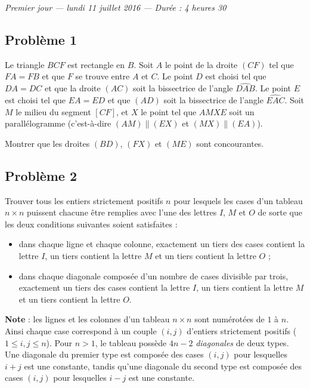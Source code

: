 
\begin{center}
  \emph{Premier jour --- lundi 11 juillet 2016 --- Durée : 4 heures 30}
\end{center}

\subsection*{Problème 1}
Le triangle $BCF$ est rectangle en $B$. Soit $A$ le point de la droite $(CF)$ tel que $FA = FB$ et que $F$ se
trouve entre $A$ et $C$. Le point $D$ est choisi tel que $DA = DC$ et que la droite $(AC)$ soit la bissectrice
de l'angle $\widehat{DAB}$. Le point $E$ est choisi tel que $EA = ED$ et que $(AD)$ soit la bissectrice de
l'angle $\widehat{EAC}$. Soit $M$ le milieu du segment $[CF]$, et $X$ le point tel que $AMXE$ soit un
parallélogramme (c'est-à-dire $(AM) \parallel (EX)$ et $(MX) \parallel (EA)$).

Montrer que les droites $(BD)$, $(FX)$ et $(ME)$ sont concourantes.

\subsection*{Problème 2}
Trouver tous les entiers strictement positifs $n$ pour lesquels les cases d'un tableau $n \times n$ puissent
chacune être remplies avec l'une des lettres $I$, $M$ et $O$ de sorte que les deux conditions suivantes soient
satisfaites :
\begin{itemize}
  \item dans chaque ligne et chaque colonne, exactement un tiers des cases contient la lettre $I$, un tiers
  contient la lettre $M$ et un tiers contient la lettre $O$ ;
  \item dans chaque diagonale composée d'un nombre de cases divisible par trois, exactement un tiers des cases
  contient la lettre $I$, un tiers contient la lettre $M$ et un tiers contient la lettre $O$.
\end{itemize}

\textbf{Note} : les lignes et les colonnes d'un tableau $n \times n$ sont numérotées de $1$ à $n$. Ainsi
chaque case correspond à un couple $(i, j)$ d'entiers strictement positifs ($1 \leq i, j \leq n$). Pour
$n > 1$, le tableau possède $4n - 2$ \emph{diagonales} de deux types. Une diagonale du premier type est
composée des cases $(i, j)$ pour lesquelles $i + j$ est une constante, tandis qu'une diagonale du second type
est composée des cases $(i, j)$ pour lesquelles $i - j$ est une constante.

